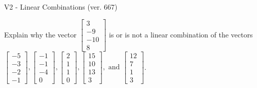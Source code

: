 \begin{exercise}
  \begin{exerciseTitle}V2 - Linear Combinations (ver. 667)\end{exerciseTitle}
  \begin{exerciseStatement}
    Explain why the vector \(\left[\begin{array}{c}
3 \\
-9 \\
-10 \\
8
\end{array}\right]\)  is or is not a linear 
	combination of the vectors \(\left[\begin{array}{c}
-5 \\
-3 \\
-2 \\
-1
\end{array}\right] , \left[\begin{array}{c}
-1 \\
-1 \\
-4 \\
0
\end{array}\right] , \left[\begin{array}{c}
2 \\
1 \\
1 \\
0
\end{array}\right] , \left[\begin{array}{c}
15 \\
10 \\
13 \\
3
\end{array}\right] , \text{ and } \left[\begin{array}{c}
12 \\
7 \\
1 \\
3
\end{array}\right]\).
	



\end{exerciseStatement}
\end{exercise}
